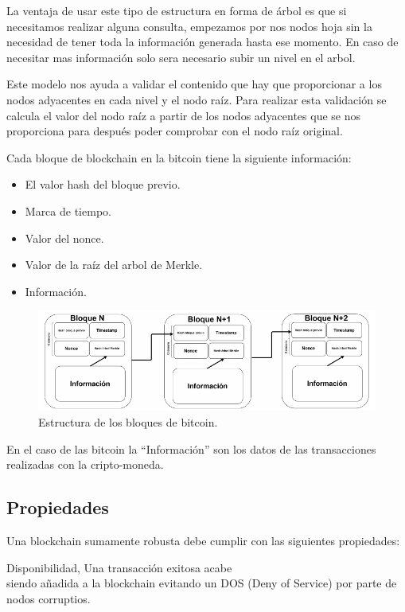 \documentclass[conference]{IEEEtran}
\begin{document}
La ventaja de usar este tipo de estructura en forma de árbol es que si necesitamos realizar alguna consulta, empezamos por nos nodos hoja sin la necesidad de tener toda la información generada hasta ese momento. En caso de necesitar mas información solo sera necesario subir un nivel en el arbol.

Este modelo nos ayuda a validar el contenido que hay que proporcionar a los nodos adyacentes en cada nivel y el nodo raíz. Para realizar esta validación se calcula el valor del nodo raíz a partir de los nodos adyacentes que se nos proporciona para después poder comprobar con el nodo raíz original.

Cada bloque de blockchain en la bitcoin tiene la siguiente información:

\begin{itemize}
    \item El valor hash del bloque previo.
    \item Marca de tiempo.
    \item Valor del nonce.
    \item Valor de la raíz del arbol de Merkle.
    \item Información.
\end{itemize}

\begin{figure}[htpb]
    \centering
    \includegraphics[scale=.4]{assets/images/bloques.png}
    \caption{Estructura de los bloques de bitcoin.}
\end{figure}

En el caso de las bitcoin la ``Información'' son los datos de las transacciones realizadas con la cripto-moneda.

\subsection{Propiedades}

Una blockchain sumamente robusta debe cumplir con las siguientes propiedades:

Disponibilidad, Una transacción exitosa acabe \\ siendo añadida a la blockchain evitando un DOS (Deny of Service) por parte de nodos corruptios.
\end{document}
